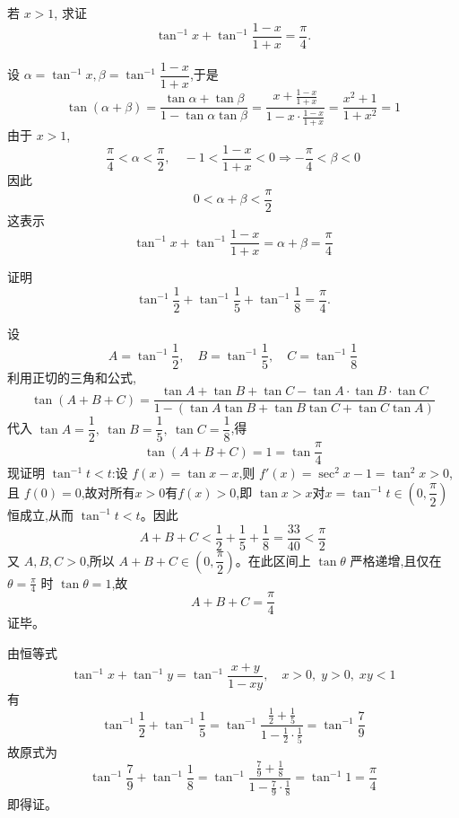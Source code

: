 \begin{questions}
    \question 若 $x>1$, 求证
    \[
    \tan^{-1} x + \tan^{-1} \frac{1-x}{1+x} = \frac{\pi}{4}.
    \]
    \begin{solution}
        设 $\alpha = \tan^{-1} x, \beta = \tan^{-1} \dfrac{1-x}{1+x}$,于是
        \[
        \tan(\alpha + \beta) = \frac{\tan \alpha + \tan \beta}{1 - \tan \alpha \tan \beta} = \frac{x + \frac{1-x}{1+x}}{1 - x \cdot \frac{1-x}{1+x}}= \frac{x^2+1}{1+x^2} = 1 
        \]
        由于 $x>1$, 
        \[
        \frac{\pi}{4} < \alpha < \frac{\pi}{2}, \quad -1 < \frac{1-x}{1+x} < 0 \Rightarrow -\frac{\pi}{4} < \beta < 0
        \]
        因此 
        \[
        0 < \alpha + \beta < \frac{\pi}{2}
        \]
        这表示
        \[
        \tan^{-1} x + \tan^{-1} \frac{1-x}{1+x} =\alpha + \beta= \frac{\pi}{4}
        \]
    \end{solution}

    \question 证明
    \[
    \tan^{-1}\frac{1}{2}+\tan^{-1}\frac{1}{5}+\tan^{-1}\frac{1}{8}=\frac{\pi}{4}.
    \]
    \begin{solution}
        设
        \[
        A=\tan^{-1}\frac{1}{2},\quad B=\tan^{-1}\frac{1}{5},\quad C=\tan^{-1}\frac{1}{8}
        \]
        利用正切的三角和公式,
        \[
        \tan(A+B+C)
        =\frac{\tan A+\tan B+\tan C-\tan A\cdot\tan B\cdot\tan C}
        {1-(\tan A\tan B+\tan B\tan C+\tan C\tan A)}
        \]
        代入 $\tan A=\dfrac{1}{2},\ \tan B=\dfrac{1}{5},\ \tan C=\dfrac{1}{8}$,得
        \[
        \tan(A+B+C)=1=\tan\frac{\pi}{4}
        \]
        现证明 $\tan^{-1} t<t$:设 $f(x)=\tan x - x$,则 $f'(x)=\sec^2 x - 1 = \tan^2 x > 0$,且 $f(0)=0$,故对所有$x>0$有$f(x)>0$,即 $\tan x > x$对$x=\tan^{-1}t \in \left(0,\dfrac{\pi}{2}\right)$恒成立,从而 $\tan^{-1} t < t$。因此
        \[
        A+B+C < \frac{1}{2}+\frac{1}{5}+\frac{1}{8}=\frac{33}{40}<\frac{\pi}{2}
        \]
        又 $A,B,C>0$,所以 $A+B+C\in\left(0,\dfrac{\pi}{2}\right)$。在此区间上 $\tan\theta$ 严格递增,且仅在 $\theta=\frac{\pi}{4}$ 时 $\tan\theta=1$,故
        \[
        A+B+C=\frac{\pi}{4}
        \]
        证毕。
    \end{solution}
    \begin{solution}
        由恒等式
        \[
        \tan^{-1} x + \tan^{-1} y = \tan^{-1} \frac{x+y}{1-xy}, \quad x>0,\;y>0,\;xy<1
        \]
        有
        \[
        \tan^{-1}\frac{1}{2}+\tan^{-1}\frac{1}{5} = \tan^{-1}\frac{\frac{1}{2}+\frac{1}{5}}{1-\frac{1}{2}\cdot\frac{1}{5}} = \tan^{-1}\frac{7}{9}
        \]
        故原式为
        \[
        \tan^{-1}\frac{7}{9} + \tan^{-1}\frac{1}{8} =\tan^{-1}\frac{\frac{7}{9}+\frac{1}{8}}{1-\frac{7}{9}\cdot\frac{1}{8}} = \tan^{-1}1 = \frac{\pi}{4}
        \]
        即得证。
    \end{solution}


\end{questions}

